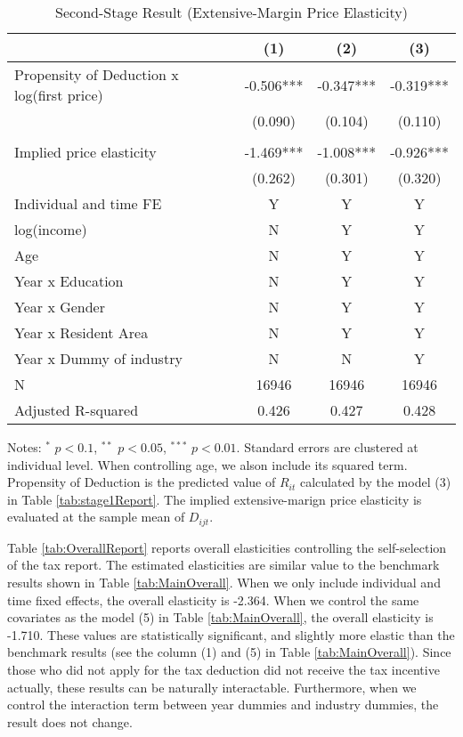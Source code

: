 \documentclass[
  11pt,
  a4paper,
]{article}
\begin{document}
\begin{table}

\caption{\label{tab:ExtensiveReport}Second-Stage Result (Extensive-Margin Price Elasticity)}
\centering
\fontsize{7}{9}\selectfont
\begin{threeparttable}
\begin{tabular}[t]{lccc}
\toprule
 & (1) & (2) & (3)\\
\midrule
Propensity of Deduction x log(first price) & -0.506*** & -0.347*** & -0.319***\\
 & (0.090) & (0.104) & (0.110)\\
 &  &  & \\
Implied price elasticity & -1.469*** & -1.008*** & -0.926***\\
 & (0.262) & (0.301) & (0.320)\\
Individual and time FE & Y & Y & Y\\
log(income) & N & Y & Y\\
Age & N & Y & Y\\
Year x Education & N & Y & Y\\
Year x Gender & N & Y & Y\\
Year x Resident Area & N & Y & Y\\
Year x Dummy of industry & N & N & Y\\
N & 16946 & 16946 & 16946\\
Adjusted R-squared & 0.426 & 0.427 & 0.428\\
\bottomrule
\end{tabular}
\begin{tablenotes}
\item Notes: $^{*}$ $p < 0.1$, $^{**}$ $p < 0.05$, $^{***}$ $p < 0.01$. Standard errors are clustered at individual level. When controlling age, we alson include its squared term. Propensity of Deduction is the predicted value of $R_{it}$ calculated by the model (3) in Table \ref{tab:stage1Report}. The implied extensive-marign price elasticity is evaluated at the sample mean of $D_{ijt}$.
\end{tablenotes}
\end{threeparttable}
\end{table}

Table \ref{tab:OverallReport} reports overall elasticities controlling the self-selection of the tax report.
The estimated elasticities are similar value to the benchmark results shown in Table \ref{tab:MainOverall}.
When we only include individual and time fixed effects, the overall elasticity is -2.364.
When we control the same covariates as the model (5) in Table \ref{tab:MainOverall},
the overall elasticity is -1.710.
These values are statistically significant,
and slightly more elastic than the benchmark results
(see the column (1) and (5) in Table \ref{tab:MainOverall}).
Since those who did not apply for the tax deduction did not receive the tax incentive actually,
these results can be naturally interactable.
Furthermore, when we control the interaction term between year dummies and industry dummies,
the result does not change.
\end{document}
